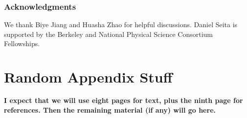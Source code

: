 \documentclass{article} %
\begin{document}
\subsubsection*{Acknowledgments}

We thank Biye Jiang and Huasha Zhao for helpful discussions. Daniel Seita is supported by the
Berkeley and National Physical Science Consortium Fellowships.













\clearpage
\appendix

\section{Random Appendix Stuff}

\textbf{I expect that we will use eight pages for text, plus the ninth page for references. Then the
remaining material (if any) will go here.}
\end{document}
